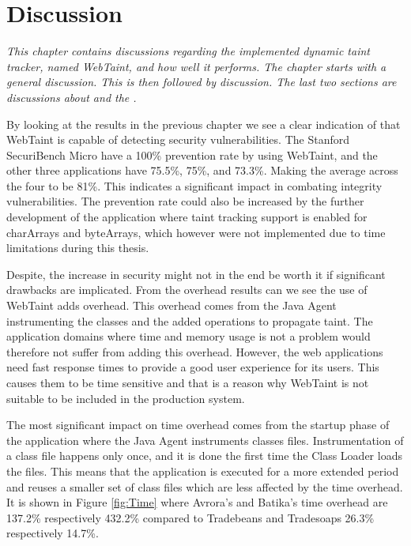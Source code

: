 \chapter{Discussion}
\label{Discussion}
\textit{This chapter contains discussions regarding the implemented dynamic taint tracker, named WebTaint, and how well it performs. The chapter starts with a general discussion. This is then followed by \textit{} discussion. The last two sections are discussions about \textit{} and the \textit{}.}

By looking at the results in the previous chapter we see a clear indication of that WebTaint is capable of detecting security vulnerabilities. The Stanford SecuriBench Micro have a 100\% prevention rate by using WebTaint, and the other three applications have 75.5\%, 75\%, and 73.3\%. Making the average across the four to be 81\%. This indicates a significant impact in combating integrity vulnerabilities. The prevention rate could also be increased by the further development of the application where taint tracking support is enabled for charArrays and byteArrays, which however were not implemented due to time limitations during this thesis.

Despite, the increase in security might not in the end be worth it if significant drawbacks are implicated. From the overhead results can we see the use of WebTaint adds overhead. This overhead comes from the Java Agent instrumenting the classes and the added operations to propagate taint. The application domains where time and memory usage is not a problem would therefore not suffer from adding this overhead. However, the web applications need fast response times to provide a good user experience for its users. This causes them to be time sensitive and that is a reason why WebTaint is not suitable to be included in the production system.

The most significant impact on time overhead comes from the startup phase of the application where the Java Agent instruments classes files. Instrumentation of a class file happens only once, and it is done the first time the Class Loader loads the files. This means that the application is executed for a more extended period and reuses a smaller set of class files which are less affected by the time overhead. It is shown in Figure \ref{fig:Time} where Avrora's and Batika's time overhead are 137.2\% respectively 432.2\% compared to Tradebeans and Tradesoaps 26.3\% respectively 14.7\%.

